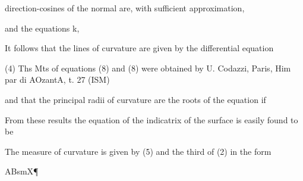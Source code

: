 direction-cosines of the normal are, with sufficient approximation,

and the equations k,


It follows that the lines of curvature are given by the differential equation


(4) Ths Mts of equations (8) and (8) were obtained by
U. Codazzi, Paris, Him par di AOzantA, t. 27 (ISM)

and that the principal radii of curvature are the roots of the equation if


From these results the equation of the indicatrix of the surface is easily
found to be


The measure of curvature is given by (5) and the third of (2) in the form

ABsmX\P

